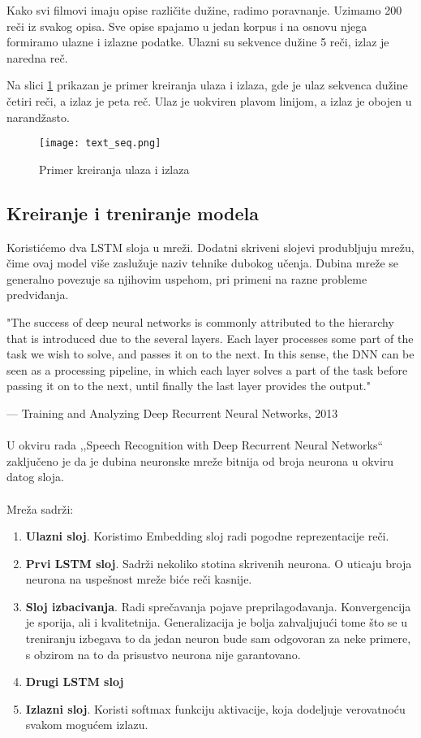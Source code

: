 \documentclass[a4paper]{article}
\begin{document}
Kako svi filmovi imaju opise različite dužine, radimo poravnanje. Uzimamo 200 reči iz svakog opisa. Sve opise spajamo u jedan korpus i na osnovu njega formiramo ulazne i izlazne podatke. Ulazni su sekvence dužine 5 reči, izlaz je naredna reč.

Na slici \ref{fig:text_seq} prikazan je primer kreiranja ulaza i izlaza, gde je ulaz sekvenca dužine četiri reči, a izlaz je peta reč. Ulaz je uokviren plavom linijom, a izlaz je obojen u narandžasto.


\begin{figure}[htp]
    \centering
    \texttt{[image: text\_seq.png]}
    \caption{Primer kreiranja ulaza i izlaza}
    \label{fig:text_seq}
\end{figure}



\subsection{Kreiranje i treniranje modela}

Koristićemo dva LSTM sloja u mreži. Dodatni skriveni slojevi produbljuju mrežu, čime ovaj model više zaslužuje naziv tehnike dubokog učenja. Dubina mreže se generalno povezuje sa njihovim uspehom, pri primeni na razne probleme predviđanja. 

"The success of deep neural networks is commonly attributed to the hierarchy that is introduced due to the several layers. Each layer processes some part of the task we wish to solve, and passes it on to the next. In this sense, the DNN can be seen as a processing pipeline, in which each layer solves a part of the task before passing it on to the next, until finally the last layer provides the output."

— Training and Analyzing Deep Recurrent Neural Networks, 2013  \cite{NIPS2013_5166}\\
\\
U okviru rada ,,Speech Recognition with Deep Recurrent Neural Networks`` \cite{graves2013speech} zaključeno je da je dubina neuronske mreže bitnija od broja neurona u okviru datog sloja.
\\
\\
Mreža sadrži:

\begin{enumerate}
    \item \textbf{Ulazni sloj}. Koristimo Embedding sloj radi pogodne reprezentacije reči. 
    \item \textbf{Prvi LSTM sloj}. Sadrži nekoliko stotina skrivenih neurona. O uticaju broja neurona na uspešnost mreže biće reči kasnije.
    \item \textbf{Sloj izbacivanja}. Radi sprečavanja pojave preprilagođavanja. Konvergencija je sporija, ali i kvalitetnija. Generalizacija je bolja zahvaljujući tome što se u treniranju izbegava to da jedan neuron bude sam odgovoran za neke primere, s obzirom na to da prisustvo neurona nije garantovano.
    \item \textbf{Drugi LSTM sloj}
    \item \textbf{Izlazni sloj}. Koristi softmax funkciju aktivacije, koja dodeljuje verovatnoću svakom mogućem izlazu. 
\end{enumerate}
\end{document}
